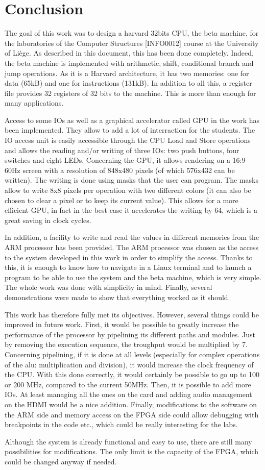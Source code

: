\chapter{Conclusion}

The goal of this work was to design a harvard 32bits CPU, the beta machine, for the laboratories of the Computer 
Structures [INFO0012] 
course at the University of Liège. As described in this document, this has been done completely. 
Indeed, the beta machine is implemented with arithmetic, shift, conditional branch and jump operations. As 
it is a Harvard architecture, it has two memories: one for data (65kB) and one for instructions (131kB). In addition to 
all this, a register file provides 32 registers of 32 bits to the machine. This is more than enough for many applications.

Access to some IOs as well as a graphical accelerator called GPU in the work has been
implemented. They allow to add a lot of interraction for the students. 
The IO access unit is easily accessible through the CPU Load and Store operations and allows the 
reading and/or writing of three IOs: two push buttons, four switches and eight LEDs. Concerning the 
GPU, it allows rendering on a 16:9 60Hz screen with a resolution of 848x480 pixels (of which 
576x432 can be written). The writing is done using masks that the user can program. The masks 
allow to write 8x8 pixels per operation with two different colors (it can also be chosen to clear 
a pixel or to keep its current value). This allows for a more efficient GPU, in fact in the best 
case it accelerates the writing by 64, which is a great saving in clock cycles.

In addition, a facility to write and 
read the values in different memories from the ARM processor has been provided. 
The ARM processor was chosen as the access to the system developed in this work in order to simplify 
the access.  Thanks to this, it is enough to know how to navigate in a Linux terminal and to launch a program 
to be able to use the system and the beta machine, which is very simple. The whole work was done with simplicity 
in mind.  Finally, several demonstrations were 
made to show that everything worked as it should.

This work has therefore fully met its objectives. However, several things could be improved in future 
work. First, it would be possible to greatly increase the performance of the processor by pipelining 
its different paths and modules. Just by removing the execution sequence, the troughput would be 
multiplied by 7. Concerning pipelining, if it is done at all levels (especially for complex operations 
of the alu: multiplication and division), it would increase the clock frequency of the CPU. With 
this done correctly, it would certainly be possible to go up to 100 or 200 MHz, compared to the current 50MHz. Then, it 
is possible to add more IOs. At least managing all the ones on the card and adding audio management 
on the HDMI would be a nice addition. Finally, modifications to the software on the ARM side and 
memory access on the FPGA side could allow debugging with breakpoints in the code etc., which could 
be really interesting for the labs. 

Although the system is already functional and easy to use, there are still many possibilities for 
modifications. The only limit is the capacity of the FPGA, which could be changed anyway if needed.
